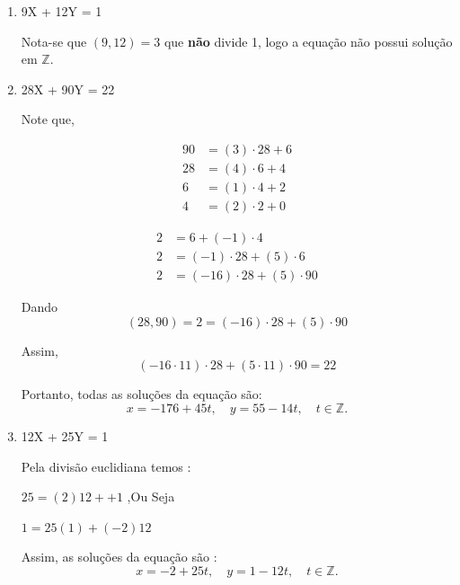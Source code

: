 \begin{enumerate}[left=0.5cm, align=left, nosep]

\item 9X + 12Y = 1

    Nota-se que $(9,12) = 3$ que \textbf{não} divide 1, logo a equação não possui solução em $\mathbb{Z}$. 

\item 28X + 90Y = 22

    Note que,
    \begin{minipage}[t]{0.45\linewidth}
        \begin{align*}
                90 &= (3)\cdot 28 + 6 \\
                28 &= (4)\cdot 6 + 4 \\
                6  &= (1)\cdot 4 + 2 \\
                4  &= (2)\cdot 2 + 0
        \end{align*}
    \end{minipage}\hfill
    \begin{minipage}[t]{0.45\linewidth}
        \begin{align*}
            2  &= 6 + (-1)\cdot 4 \\
            2  &= (-1)\cdot 28 + (5)\cdot 6 \\
            2  &= (-16)\cdot 28 + (5)\cdot 90
        \end{align*}
    \end{minipage}

    Dando 
    \[
        (28,90) = 2 = (-16)\cdot 28 + (5)\cdot 90
    \]

    Assim, 
    \[
        (-16 \cdot 11)\cdot 28 + (5 \cdot 11)\cdot 90 = 22
    \]

    Portanto, todas as soluções da equação são:
    \[
        x = -176 + 45t, \quad y = 55 - 14t, \quad t \in \mathbb{Z}.
    \]

\item 12X + 25Y = 1

    Pela divisão euclidiana temos : 
    
    $25 = (2)12 + + 1$ ,Ou Seja
    
    $1 = 25(1) + (-2)12$
    
    Assim, as soluções da equação são : 
    \[
        x = -2 + 25t, \quad y = 1 - 12t, \quad t \in \mathbb{Z}.
    \]

\end{enumerate}
